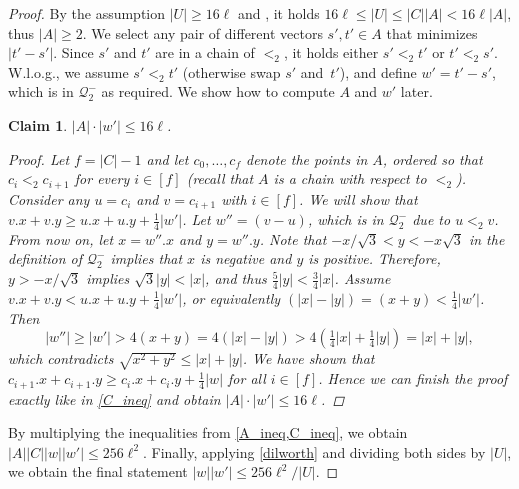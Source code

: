 \documentclass[twoside,leqno]{article}
\newtheorem{claim}{Claim}[section]
\newcommand{\Q}{\mathcal{Q}}
\newcommand{\absolute}[1]{\left\lvert#1\right\rvert}
\begin{document}
\begin{proof}
By the assumption $\absolute{U} \ge 16\ell$ and , it holds
$16 \ell \le \absolute{U} \le \absolute{C} \absolute{A} < 16\ell\absolute{A}$,
thus $\absolute{A} \ge 2$.
We select any pair of different vectors $s', t' \in A$ that minimizes $\absolute{t' - s'}$. Since $s'$ and $t'$ are in a chain of $<_2$, it holds either $s' <_2 t'$ or $t' <_2 s'$. W.l.o.g., we assume $s' <_2 t'$ (otherwise swap $s'$ and~$t'$), and define $w' = t' - s'$, which is in $\Q_2^-$ as required.  We show how to compute $A$ and $w'$ later.

\begin{claim}\label{A_ineq}
	$\absolute{A}\cdot \absolute{w'} \leq 16\ell$. 
	\begin{proof}
	
		Let $f = \absolute{C} - 1$ and
		let $c_0, \dots, c_{f}$ denote the points in $A$, ordered so that $c_i <_2 c_{i + 1}$ for every $i \in [f]$ (recall that $A$ is a chain with respect to $<_2$).
		Consider any $u = c_i$ and $v = c_{i + 1}$ with $i \in [f]$. We will show that $v.x + v.y \geq u.x + u.y + \frac14\absolute{w'}$. 		
		Let $w'' = (v - u)$, which is in $\Q_2^-$ due to $u <_2 v$. From now on, let $x = w''.x$ and $y = w''.y$. 
		Note that $-x/\sqrt{3} < y < -x \sqrt{3}$ in the definition of $\Q_2^-$ implies that $x$ is negative and $y$ is positive.
		Therefore, $y > -x/\sqrt{3}$ implies $\sqrt{3}\absolute{y} < \absolute{x}$, and thus $\frac 5 4\absolute{y} < \frac 3 4\absolute{x}$.
		Assume $v.x + v.y < u.x + u.y + \frac14\absolute{w'}$, or equivalently $(\absolute{x} - \absolute{y}) = (x + y) < \frac14\absolute{w'}$. Then $$\absolute{w''} \geq \absolute{w'} > 4(x + y) = 4(\absolute{x} - \absolute{y}) > 4(\tfrac14\absolute{x} + \tfrac14\absolute{y}) = 
		\absolute{x} + \absolute{y},$$
		which contradicts $\sqrt{x^2 + y^2} \leq \absolute{x} + \absolute{y}$. We have shown that $c_{i + 1}.x + c_{i + 1}.y \geq c_i.x + c_i.y + \frac14\absolute{w}$ for all $i \in [f]$. Hence we can finish the proof exactly like in \cref{C_ineq} and obtain $\absolute{A}\cdot \absolute{w'} \leq 16\ell$.
	\end{proof}
\end{claim}

By multiplying the inequalities from \cref{A_ineq,C_ineq}, we obtain $\absolute{A}\absolute{C}\absolute{w}\absolute{w'} \leq 256\ell^2$. Finally, applying \cref{dilworth} and dividing both sides by $\absolute{U}$, we obtain the final statement $\absolute{w}\absolute{w'} \leq 256\ell^2/\absolute{U}$.


\end{proof}
\end{document}
